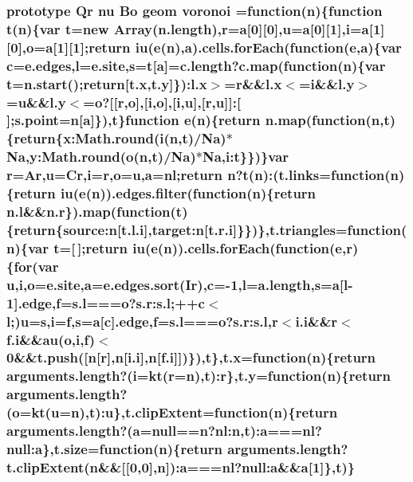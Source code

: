\subsubsection[{voronoi}]{ {\bf prototype} {\bf Qr} {\bf nu} {\bf Bo} geom voronoi =function({\bf n})\{function t({\bf n})\{var t=new Array(n.\+length),{\bf r}={\bf a}[0][0],u={\bf a}[0][1],{\bf i}={\bf a}[1][0],{\bf o}={\bf a}[1][1];{\bf return} {\bf iu}({\bf e}({\bf n}),{\bf a}).{\bf cells.\+for\+Each}(function({\bf e},{\bf a})\{var {\bf c}=e.\+edges,l=e.\+site,s=t[{\bf a}]=c.\+length?{\bf c.\+map}(function({\bf n})\{var t=n.\+start();{\bf return}[{\bf t.\+x},t.\+y]\})\+:{\bf l.\+x}$>$={\bf r}\&\&{\bf l.\+x}$<$={\bf i}\&\&l.\+y$>$=u\&\&l.\+y$<$={\bf o}?[[{\bf r},{\bf o}],[{\bf i},{\bf o}],[{\bf i},u],[{\bf r},u]]\+:[$\,$];s.\+point={\bf n}[{\bf a}]\}),t\}function {\bf e}({\bf n})\{{\bf return} {\bf n.\+map}(function({\bf n},t)\{{\bf return}\{{\bf x\+:\+Math.\+round}({\bf i}({\bf n},t)/{\bf Na})$\ast${\bf Na},{\bf y\+:\+Math.\+round}({\bf o}({\bf n},t)/{\bf Na})$\ast${\bf Na},i\+:t\}\})\}var {\bf r}={\bf Ar},u={\bf Cr},{\bf i}={\bf r},{\bf o}=u,{\bf a}={\bf nl};{\bf return} {\bf n}?t({\bf n})\+:(t.\+links=function({\bf n})\{{\bf return} {\bf iu}({\bf e}({\bf n})).{\bf edges.\+filter}(function({\bf n})\{{\bf return} n.\+l\&\&{\bf n.\+r}\}).{\bf map}(function(t)\{{\bf return}\{source\+:n[{\bf t.\+l.\+i}],target\+:n[{\bf t.\+r.\+i}]\}\})\},t.\+triangles=function({\bf n})\{var t=[$\,$];{\bf return} {\bf iu}({\bf e}({\bf n})).{\bf cells.\+for\+Each}(function({\bf e},{\bf r})\{{\bf for}(var u,{\bf i},{\bf o}=e.\+site,{\bf a}={\bf e.\+edges.\+sort}({\bf Ir}),{\bf c}=-\/1,l=a.\+length,s={\bf a}[l-\/1].edge,{\bf f}=s.\+l==={\bf o}?s.\+r\+:s.\+l;++{\bf c}$<$l;)u=s,{\bf i}={\bf f},s={\bf a}[{\bf c}].edge,{\bf f}=s.\+l==={\bf o}?s.\+r\+:s.\+l,{\bf r}$<${\bf i.\+i}\&\&{\bf r}$<${\bf f.\+i}\&\&{\bf au}({\bf o},{\bf i},{\bf f})$<$0\&\&t.\+push([{\bf n}[{\bf r}],{\bf n}[{\bf i.\+i}],{\bf n}[{\bf f.\+i}]])\}),t\},{\bf t.\+x}=function({\bf n})\{{\bf return} arguments.\+length?({\bf i}=kt({\bf r}={\bf n}),t)\+:{\bf r}\},t.\+y=function({\bf n})\{{\bf return} arguments.\+length?({\bf o}=kt(u={\bf n}),t)\+:u\},{\bf t.\+clip\+Extent}=function({\bf n})\{{\bf return} arguments.\+length?({\bf a}=null=={\bf n}?nl\+:n,t)\+:{\bf a}==={\bf nl}?null\+:a\},{\bf t.\+size}=function({\bf n})\{{\bf return} arguments.\+length?{\bf t.\+clip\+Extent}({\bf n}\&\&[[0,0],{\bf n}])\+:{\bf a}==={\bf nl}?null\+:a\&\&{\bf a}[1]\},t)\}}\label{d3_8min_8js_ad31c7950fd39b9880a7f05bab21b9763}


